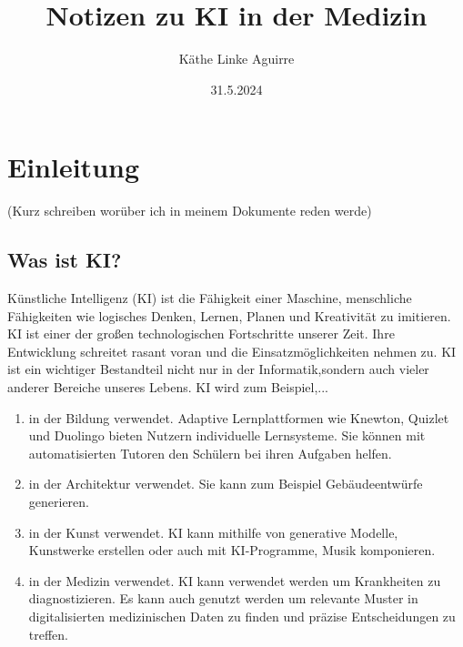 \documentclass{article}
\title{Notizen zu KI in der Medizin}
\author{Käthe Linke Aguirre}
\date{31.5.2024}
\begin{document}
\maketitle


    \tableofcontents

\newpage


\section {Einleitung}

(Kurz schreiben worüber ich in meinem Dokumente reden werde)

\subsection{Was ist KI?}
  
Künstliche Intelligenz (KI) ist die Fähigkeit einer Maschine, menschliche Fähigkeiten
wie logisches Denken, Lernen, Planen und Kreativität zu imitieren. KI ist einer der 
großen technologischen Fortschritte unserer Zeit. Ihre Entwicklung schreitet 
rasant voran und die Einsatzmöglichkeiten nehmen zu. KI ist ein wichtiger Bestandteil nicht nur in der 
Informatik,sondern auch vieler anderer Bereiche unseres Lebens. 
\newline
KI wird zum Beispiel,... 
\begin{enumerate}
    \item in der Bildung verwendet. Adaptive Lernplattformen wie Knewton, Quizlet und Duolingo
    bieten Nutzern individuelle Lernsysteme. Sie können mit automatisierten Tutoren den Schülern bei 
    ihren Aufgaben helfen.
    \item in der Architektur verwendet. Sie kann zum Beispiel Gebäudeentwürfe generieren.
    \item in der Kunst verwendet. KI kann mithilfe von generative Modelle, Kunstwerke erstellen oder 
    auch mit KI-Programme, Musik komponieren.
    \item in der Medizin verwendet. KI kann verwendet werden um Krankheiten zu diagnostizieren. Es kann auch genutzt werden um relevante Muster in digitalisierten medizinischen 
    Daten zu finden und präzise Entscheidungen zu treffen.
\end{enumerate}
\end{document}
